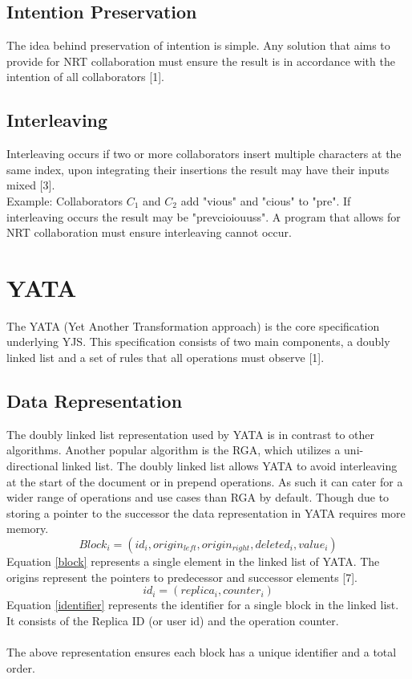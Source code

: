 \documentclass[9pt, titlepage]{article}
\begin{document}
  \subsection{Intention Preservation}
  The idea behind preservation of intention is simple. Any solution that aims to provide for NRT collaboration must ensure the result is in accordance with the intention of all collaborators [1].

  \subsection{Interleaving}
  Interleaving occurs if two or more collaborators insert multiple characters at the same index, upon integrating their insertions the result may have their inputs mixed [3].\\
  Example: Collaborators \(C_{1}\) and \(C_{2}\) add "vious" and "cious" to "pre". If interleaving occurs the result may be "prevcioiouuss".
  A program that allows for NRT collaboration must ensure interleaving cannot occur.

  \section{YATA}
  The YATA (Yet Another Transformation approach) is the core specification underlying YJS.
  This specification consists of two main components, a doubly linked list and a set of rules that all operations must observe [1].
  
  \subsection{Data Representation}
  The doubly linked list representation used by YATA is in contrast to other algorithms. Another popular algorithm is the RGA, which utilizes a uni-directional linked list.
  The doubly linked list allows YATA to avoid interleaving at the start of the document or in prepend operations.
  As such it can cater for a wider range of operations and use cases than RGA by default. 
  Though due to storing a pointer to the successor the data representation in YATA requires more memory.
  \begin{equation} \label{block}
    Block_{i} = (id_{i}, origin_{left}, origin_{right}, deleted_{i}, value_{i})
  \end{equation}
  Equation \ref{block} represents a single element in the linked list of YATA. The origins represent the pointers to predecessor and successor elements [7].
  \begin{equation} \label{identifier}
    id_{i} = (replica_{i}, counter_{i})
  \end{equation}
  Equation \ref{identifier} represents the identifier for a single block in the linked list. It consists of the Replica ID (or user id) and the operation counter.\\\\
  The above representation ensures each block has a unique identifier and a total order. 
  
\end{document}
